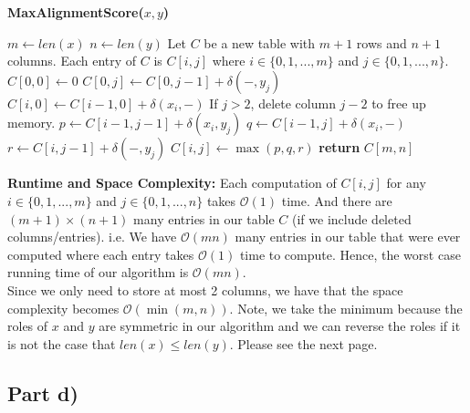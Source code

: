 \documentclass[12pt]{article}
\begin{document}
\begin{algorithm}[hbt!]
\caption{\textbf{MaxAlignmentScore($x,y$)}}\label{alg:cap}

\begin{algorithmic}[1]
\State $m \gets len(x)$ 
\State $n \gets len(y)$
\State
\State Let $C$ be a new table with $m+1$ rows and $n+1$ columns. Each entry of $C$ is $C[i,j]$ where $i \in \{0,1,...,m\}$ and $j \in \{0,1,...,n\}$. 
\State
\State $C[0,0] \gets 0$ 
\State
{} 
    \State $C[0,j] \gets C[0,j-1] + \delta(-,y_j)$
\EndFor
\State
{} 
    \State $C[i,0] \gets C[i-1,0] + \delta(x_i,-)$
\EndFor
\State
{} 
        \State If $j > 2$, delete column $j-2$ to free up memory.
        \State $p \gets C[i-1,j-1] + \delta(x_i,y_j)$
        \State $q \gets C[i-1,j] + \delta(x_i,-)$
        \State $r \gets C[i,j-1] + \delta(-,y_j)$
        \State $C[i,j] \gets \max(p,q,r)$
    \EndFor
\EndFor
\State
\State \textbf{return} $C[m,n]$
\end{algorithmic}
\end{algorithm}
\textbf{Runtime and Space Complexity:} Each computation of $C[i,j]$ for any $i \in \{0,1,...,m\}$ and $j \in \{0,1,...,n\}$ takes $\mathcal{O}(1)$ time. And there are $(m+1) \times (n+1)$ many entries in our table $C$ (if we include deleted columns/entries). i.e. We have $\mathcal{O}(mn)$ many entries in our table that were ever computed where each entry takes $\mathcal{O}(1)$ time to compute. Hence, the worst case running time of our algorithm is $\mathcal{O}(mn)$. \\

Since we only need to store at most 2 columns, we have that the space complexity becomes $\mathcal{O}(\min(m,n))$. Note, we take the minimum because the roles of $x$ and $y$ are symmetric in our algorithm and we can reverse the roles if it is not the case that $len(x) \leq len(y)$. Please see the next page. 

\newpage

\subsection*{Part d)}
\end{document}

